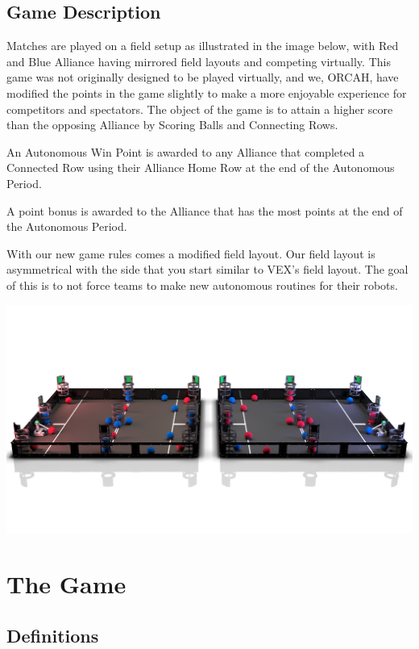 \documentclass[letterpaper, 12pt]{article}
\begin{document}
\subsection{Game Description}

Matches are played on a field setup as illustrated in the image below, with Red and Blue Alliance having mirrored field layouts and competing virtually.  This game was not originally designed to be played virtually, and we, ORCAH, have modified the points in the game slightly to make a more enjoyable experience for competitors and spectators.  The object of the game is to attain a higher score than the opposing Alliance by Scoring Balls and Connecting Rows.  

An Autonomous Win Point is awarded to any Alliance that completed a Connected Row using their Alliance Home Row at the end of the Autonomous Period.  

A point bonus is awarded to the Alliance that has the most points at the end of the Autonomous Period. 

With our new game rules comes a modified field layout.  Our field layout is asymmetrical with the side that you start similar to VEX’s field layout.  The goal of this is to not force teams to make new autonomous routines for their robots.

\begin{center}
\includegraphics[scale=0.25]{fields}
\end{center}

\newpage

\section{The Game}
\subsection{Definitions}
\end{document}
